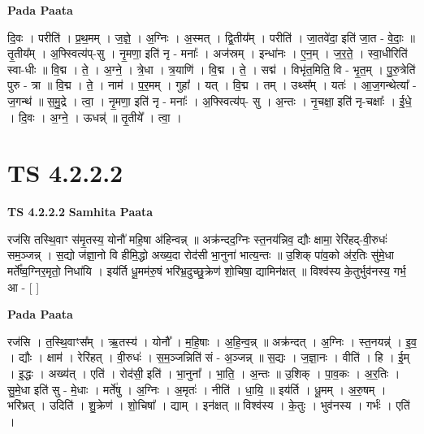 \documentclass[17pt]{extarticle}
\begin{document}
\textbf{Pada Paata} \newline

दि॒वः । परीति॑ । प्र॒थ॒मम् । ज॒ज्ञे॒ । अ॒ग्निः । अ॒स्मत् । द्वि॒तीय᳚म् । परीति॑ । जा॒तवे॑दा॒ इति॑ जा॒त - वे॒दाः॒ ॥ तृ॒तीय᳚म् । अ॒फ्स्वित्य॑प्-सु । नृ॒मणा॒ इति॑ नृ - मनाः᳚ । अज॑स्रम् । इन्धा॑नः । ए॒न॒म् । ज॒र॒ते॒ । स्वा॒धीरिति॑ स्वा-धीः ॥ वि॒द्म । ते॒ । अ॒ग्ने॒ । त्रे॒धा । त्र॒याणि॑ । वि॒द्म । ते॒ । सद्म॑ । विभृ॑त॒मिति॒ वि - भृ॒त॒म् । पु॒रु॒त्रेति॑ पुरु - त्रा ॥ वि॒द्म । ते॒ । नाम॑ । प॒र॒मम् । गुहा᳚ । यत् । वि॒द्म । तम् । उथ्स᳚म् । यतः॑ । आ॒ज॒गन्थेत्या᳚ - ज॒गन्थ॑ ॥ स॒मु॒द्रे । त्वा॒ । नृ॒मणा॒ इति॑ नृ - मनाः᳚ । अ॒फ्स्वित्य॑प्- सु । अ॒न्तः । नृ॒चक्षा॒ इति॑ नृ-चक्षाः᳚ । ई॒धे॒ । दि॒वः । अ॒ग्ने॒ । ऊधन्न्॑ ॥ तृ॒तीये᳚ । त्वा॒ ।  \newline




\section*{ TS 4.2.2.2 }

\textbf{TS 4.2.2.2 } \newline
\textbf{Samhita Paata} \newline

रज॑सि तस्थि॒वाꣳ स॑मृ॒तस्य॒ योनौ॑ महि॒षा अ॑हिन्वन्न् ॥ अक्र॑न्दद॒ग्निः स्त॒नय॑न्निव॒ द्यौः क्षामा॒ रेरि॑हद्-वी॒रुधः॑ सम॒ञ्जन्न् । स॒द्यो ज॑ज्ञा॒नो वि हीमि॒द्धो अख्य॒दा रोद॑सी भा॒नुना॑ भात्य॒न्तः ॥ उ॒शिक् पा॑व॒को अ॑र॒तिः सु॑मे॒धा मर्ते᳚ष्व॒ग्निर॒मृतो॒ निधा॑यि । इय॑र्ति धू॒मम॑रु॒षं भरि॑भ्र॒दुच्छु॒क्रेण॑ शो॒चिषा॒ द्यामिन॑क्षत् ॥ विश्व॑स्य के॒तुर्भुव॑नस्य॒ गर्भ॒ आ - [  ] \newline

\textbf{Pada Paata} \newline

रज॑सि । त॒स्थि॒वाꣳस᳚म् । ऋ॒तस्य॑ । योनौ᳚ । म॒हि॒षाः । अ॒हि॒न्व॒न्न् ॥ अक्र॑न्दत् । अ॒ग्निः । स्त॒नयन्न्॑ । इ॒व॒ । द्यौः । क्षाम॑ । रेरि॑हत् । वी॒रुधः॑ । स॒म॒ञ्जन्निति॑ सं - अ॒ञ्जन्न् ॥ स॒द्यः । ज॒ज्ञा॒नः । वीति॑ । हि । ई॒म् । इ॒द्धः । अख्य॑त् । एति॑ । रोद॑सी॒ इति॑ । भा॒नुना᳚ । भा॒ति॒ । अ॒न्तः ॥ उ॒शिक् । पा॒व॒कः । अ॒र॒तिः । सु॒मे॒धा इति॑ सु - मे॒धाः । मर्ते॑षु । अ॒ग्निः । अ॒मृतः॑ । नीति॑ । धा॒यि॒ ॥ इय॑र्ति । धू॒मम् । अ॒रु॒षम् । भरि॑भ्रत् । उदिति॑ । शु॒क्रेण॑ । शो॒चिषा᳚ । द्याम् । इन॑क्षत् ॥ विश्व॑स्य । के॒तुः । भुव॑नस्य । गर्भः॑ । एति॑ ।  \newline
\end{document}
